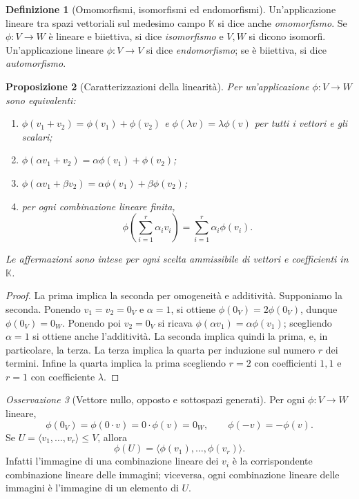 \documentclass[11pt,a4paper]{article}
\newcommand{\KK}{\mathbb{K}}
\theoremstyle{plain}
\newtheorem{prop}{Proposizione}[section]
\theoremstyle{definition}
\newtheorem{defn}[prop]{Definizione}
\theoremstyle{remark}
\newtheorem{oss}[prop]{Osservazione}
\begin{document}
\begin{defn}[Omomorfismi, isomorfismi ed endomorfismi]
Un'applicazione lineare tra spazi vettoriali sul medesimo campo $\KK$
si dice anche \emph{omomorfismo}. Se $\phi:V\to W$ è lineare e
biiettiva, si dice \emph{isomorfismo} e $V,W$ si dicono isomorfi.
Un'applicazione lineare $\phi:V\to V$ si dice \emph{endomorfismo};
se è biiettiva, si dice \emph{automorfismo}.
\end{defn}

\begin{prop}[Caratterizzazioni della linearità]
Per un'applicazione $\phi:V\to W$ sono equivalenti:
\begin{enumerate}[label=(\arabic*)]
\item $\phi(v_1+v_2)=\phi(v_1)+\phi(v_2)$ e
$\phi(\lambda v)=\lambda\phi(v)$ per tutti i vettori e gli scalari;
\item $\phi(\alpha v_1+v_2)=\alpha\phi(v_1)+\phi(v_2)$;
\item $\phi(\alpha v_1+\beta v_2)=\alpha\phi(v_1)+\beta\phi(v_2)$;
\item per ogni combinazione lineare finita,
\[
 \phi\!\left(\sum_{i=1}^r\alpha_i v_i\right)
 =\sum_{i=1}^r\alpha_i\phi(v_i).
\]
\end{enumerate}
Le affermazioni sono intese per ogni scelta ammissibile di vettori e
coefficienti in $\KK$.
\end{prop}
\begin{proof}
La prima implica la seconda per omogeneità e additività.
Supponiamo la seconda. Ponendo $v_1=v_2=0_V$ e $\alpha=1$,
si ottiene $\phi(0_V)=2\phi(0_V)$, dunque $\phi(0_V)=0_W$.
Ponendo poi $v_2=0_V$ si ricava
$\phi(\alpha v_1)=\alpha\phi(v_1)$; scegliendo $\alpha=1$
si ottiene anche l'additività. La seconda implica quindi la prima,
e, in particolare, la terza. La terza implica la quarta per induzione
sul numero $r$ dei termini. Infine la quarta implica la prima
scegliendo $r=2$ con coefficienti $1,1$ e $r=1$ con coefficiente $\lambda$.
\end{proof}

\begin{oss}[Vettore nullo, opposto e sottospazi generati]
Per ogni $\phi:V\to W$ lineare,
\[
 \phi(0_V)=\phi(0\cdot v)=0\cdot\phi(v)=0_W,
 \qquad \phi(-v)=-\phi(v).
\]
Se $U=\langle v_1,\ldots,v_r\rangle\leq V$, allora
\[
 \phi(U)=\langle\phi(v_1),\ldots,\phi(v_r)\rangle.
\]
Infatti l'immagine di una combinazione lineare dei $v_i$ è la
corrispondente combinazione lineare delle immagini; viceversa, ogni
combinazione lineare delle immagini è l'immagine di un elemento di $U$.
\end{oss}
\end{document}
